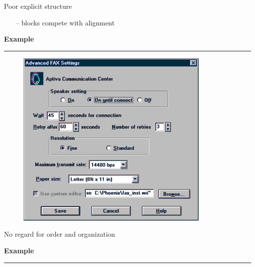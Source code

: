\documentclass[pdf]{beamer}
\begin{document}
{{{{{{{{{{{{{{\begin{frame}
    {Poor explicit structure}
	\begin{itemize}
      	\item[--]\small{blocks compete with alignment}
      	\newline
    \end{itemize} 
    
    \vspace{20px}

\end{frame}



{
\begin{frame}
{\textbf{Example}}{\textcolor{red}{\rule{12cm}{1.2pt}}}

\begin{figure}
\includegraphics[scale=0.4]{16_picture.png}
\end{figure}

{No regard for order and organization}

\vspace{5px}\hspace{-25px}\fontsize{8pt}{1pt}\selectfont{\color{gray}{IBM's Aptiva Communication Center}} 

\end{frame}



\begin{frame}
{\textbf{Example}}{\textcolor{red}{\rule{12cm}{1.2pt}}}
    

\end{frame}}}}}}}}}}}}}}}}
\end{document}
